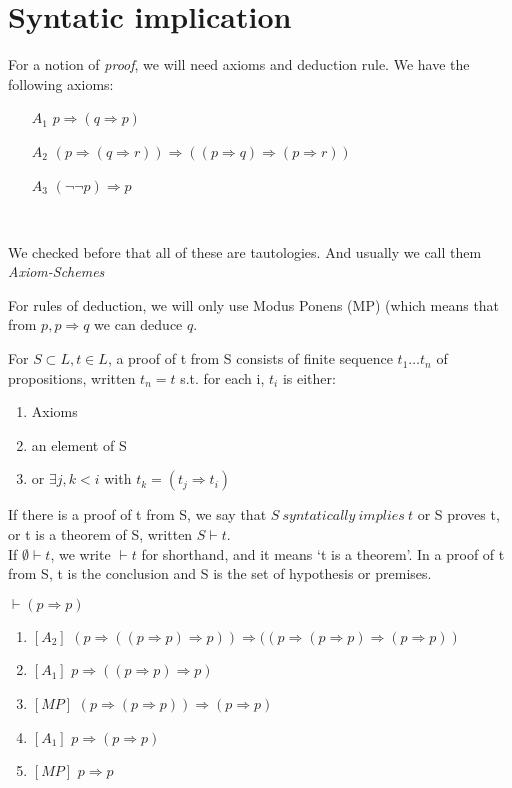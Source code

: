 \section*{Syntatic implication}
For a notion of \emph{proof}, we will need axioms and deduction rule.
We have the following axioms:
\begin{enumerate}
\item[$A_1$] $p \Rightarrow (q \Rightarrow p)$ \\
\item[$A_2$] $(p \Rightarrow (q \Rightarrow r)) \Rightarrow ((p
\Rightarrow q) \Rightarrow (p \Rightarrow r))$\\
\item[$A_3$] $(\neg \neg p) \Rightarrow p$
\end{enumerate}
~\\
\begin{remark}
We checked before that all of these are tautologies. And usually
we call them \emph{Axiom-Schemes}
\end{remark}
For rules of deduction, we will only use Modus Ponens
(MP) (which means that from $p, p \Rightarrow q$ we can deduce
$q$. \\
\begin{definition}
For $S \subset L, t \in L$, a proof of t from S consists
of finite sequence $t_1 \ldots t_n$ of propositions, written $t_n=t$
s.t. for each i, $t_i$ is either:
\begin{enumerate}
\item Axioms \\
\item an element of S\\
\item or $\exists j, k<i$ with $t_k=(t_j \Rightarrow t_i)$
\end{enumerate}
\end{definition}
If there is a proof of t from S, we say that $S~ syntatically~ implies~ t$
or S proves t, or t is a theorem of S, written $S \vdash t$.\\
If $\emptyset \vdash t$, we write $\vdash t$ for shorthand, and it means `t is a theorem'.
In a proof of t from S, t is the conclusion and S is the set of
hypothesis or premises.
\begin{example}
$\vdash (p \Rightarrow p)$
\begin{enumerate}
\item$[A_2]$ $(p \Rightarrow ((p \Rightarrow p) \Rightarrow p)) \Rightarrow ((p \Rightarrow (p \Rightarrow p) \Rightarrow (p \Rightarrow p)) $\\
\item$[A_1]$ $p \Rightarrow ((p \Rightarrow p) \Rightarrow p) $\\
\item$[MP]$ $(p \Rightarrow (p \Rightarrow p)) \Rightarrow (p \Rightarrow p)$ \\
\item$[A_1]$ $p \Rightarrow (p \Rightarrow p)$\\
\item$[MP]$ $p \Rightarrow p$
\end{enumerate}
\end{example}
